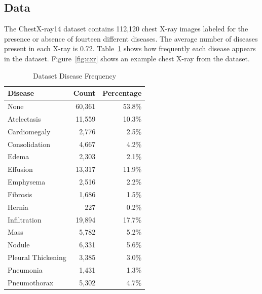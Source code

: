 \documentclass[letterpaper]{article} %
\begin{document}
\subsection{Data}
\label{sec:data}

The ChestX-ray14 dataset \cite{Wang_2017} contains 112,120 chest X-ray images labeled for the presence or absence of fourteen different diseases. The average number of diseases present in each X-ray is 0.72. Table~\ref{tab:dataset-statistics} shows how frequently each disease appears in the dataset. Figure~\ref{fig:cxr} shows an example chest X-ray from the dataset.

\begin{table}[h!]
\centering
\begin{tabular}{|l|r|r|}
\hline
\textbf{Disease} & \textbf{Count} & \textbf{Percentage} \\
\hline
None & 60,361 & 53.8\% \\
Atelectasis & 11,559 & 10.3\% \\
Cardiomegaly & 2,776 & 2.5\% \\
Consolidation & 4,667 & 4.2\% \\
Edema & 2,303 & 2.1\% \\
Effusion & 13,317 & 11.9\% \\
Emphysema & 2,516 & 2.2\% \\
Fibrosis & 1,686 & 1.5\% \\
Hernia & 227 & 0.2\% \\
Infiltration & 19,894 & 17.7\% \\
Mass & 5,782 & 5.2\% \\
Nodule & 6,331 & 5.6\% \\
Pleural Thickening & 3,385 & 3.0\% \\
Pneumonia & 1,431 & 1.3\% \\
Pneumothorax & 5,302 & 4.7\% \\
\hline
\end{tabular}
\caption{Dataset Disease Frequency}
\label{tab:dataset-statistics}
\end{table}
\end{document}

